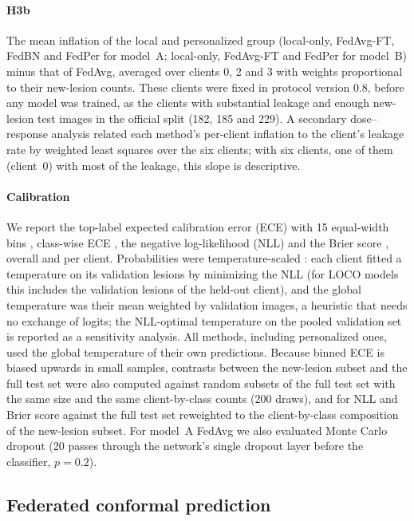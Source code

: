\paragraph{H3b} The mean inflation of the local and personalized group (local-only, FedAvg-FT, FedBN
and FedPer for model~A; local-only, FedAvg-FT and FedPer for model~B) minus that of FedAvg, averaged over
clients 0, 2 and 3 with weights proportional to their new-lesion counts. These clients were fixed in
protocol version 0.8, before any model was trained, as the clients with substantial leakage and enough
new-lesion test images in the official split (182, 185 and 229). A secondary dose--response analysis related each
method's per-client inflation to the client's leakage rate by weighted least squares over the six clients;
with six clients, one of them (client~0) with most of the leakage, this slope is descriptive.

\paragraph{Calibration} We report the top-label expected calibration error (ECE) with 15 equal-width
bins \cite{naeini2015ece,guo2017calibration}, class-wise ECE \cite{kull2019beyond}, the negative
log-likelihood (NLL) and the Brier score \cite{brier1950}, overall and per client. Probabilities were
temperature-scaled \cite{guo2017calibration}: each client fitted a temperature on its validation lesions by minimizing the NLL (for LOCO models this includes the validation lesions of the held-out client), and the global temperature was their mean weighted by validation images, a
heuristic that needs no exchange of logits; the NLL-optimal temperature on the pooled validation set is
reported as a sensitivity analysis. All methods, including personalized ones, used the global temperature
of their own predictions. Because binned ECE is biased upwards in small samples, contrasts between the
new-lesion subset and the full test set were also computed against random subsets of the full test set
with the same size and the same client-by-class counts (200 draws), and for NLL and Brier score against
the full test set reweighted to the client-by-class composition of the new-lesion subset. For model~A
FedAvg we also evaluated Monte Carlo dropout \cite{gal2016dropout} (20 passes through the network's single
dropout layer before the classifier, $p=0.2$).

\subsection{Federated conformal prediction}
\label{sec:conformal}

